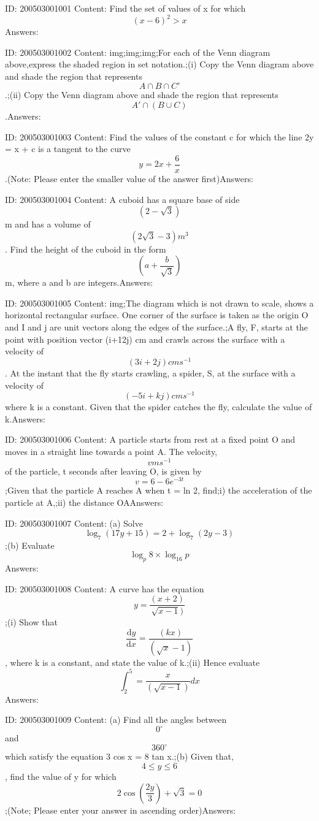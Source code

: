 \documentclass{article}
\begin{document}
ID: 200503001001
Content:
Find the set of values of x for which $$(x-6)^2>x$$Answers:

ID: 200503001002
Content:
img;img;img;For each of the Venn diagram above,express the shaded region in set notation.;(i) Copy the Venn diagram above and shade the region that represents $$A\cap B\cap C'$$.;(ii) Copy the Venn diagram above and shade the region that represents $$A'\cap (B\cup C)$$.Answers:

ID: 200503001003
Content:
Find the values of the constant c for which the line 2y = x + c is a tangent to the curve $$y=2x+\frac{6}{x}$$.(Note: Please enter the smaller value of the answer first)Answers:

ID: 200503001004
Content:
A cuboid has a square base of side $$(2-\sqrt3)$$m and has a volume of $$(2\sqrt3-3)m^3$$. Find the height of the cuboid in the form $$(a+\frac{b}{\sqrt{3}})$$m, where a and b are integers.Answers:

ID: 200503001005
Content:
img;The diagram which is not drawn to scale, shows a horizontal rectangular surface. One corner of the surface is taken as the origin O and I and j are unit vectors along the edges of the surface.;A fly, F, starts at the point with position vector (i+12j) cm and crawls across the surface with a velocity of \[(3i+2j) cms^{-1}\]. At the instant that the fly starts crawling, a spider, S, at the surface with a velocity of \[(-5i+kj) cms^{-1}\] where k is a constant. Given that the spider catches the fly, calculate the value of k.Answers:

ID: 200503001006
Content:
A particle starts from rest at a fixed point O and moves in a straight line towards a point A. The velocity, \[v m s^{-1}\] of the particle, t seconds after leaving O, is given by $$v=6-6e^{-3t}$$;Given that the particle A reaches A when t = ln 2, find;i) the acceleration of the particle at A,;ii) the distance OAAnswers:

ID: 200503001007
Content:
(a) Solve $$\log_7(17y+15)=2+\log_7(2y-3)$$;(b) Evaluate $$\log_p 8 \times \log_16 p$$Answers:

ID: 200503001008
Content:
A curve has the equation $$y=\frac{(x+2)}{\sqrt{x-1})}$$;(i)	Show that $$\frac{\mathrm{d} y}{\mathrm{d} x}=\frac{(kx)}{(\sqrt x-1)}$$, where k is a constant, and state the value of k.;(ii)	Hence evaluate $$\int_2^5=\frac{x}{(\sqrt{x-1})}dx$$Answers:

ID: 200503001009
Content:
(a) Find all the angles between $$0^{\circ}$$ and $$360^{\circ}$$ which satisfy the equation 3 cos  x = 8 tan  x.;(b)	Given that, $$4\leq y\leq6$$, find the value of y for which $$2\cos (\frac{2y}{3})+\sqrt3=0$$;(Note; Please enter your answer in ascending order)Answers:
\end{document}
